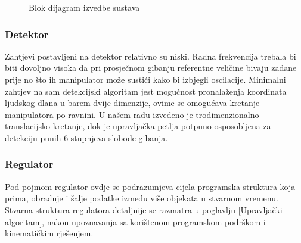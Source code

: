 \documentclass[times, utf8, diplomski, numeric]{fer}
\begin{document}
\begin{figure}[!h]
\centering
{}
\caption{Blok dijagram izvedbe sustava}\label{izvedba}
\end{figure}

\subsubsection{Detektor}
Zahtjevi postavljeni na detektor relativno su niski. 
Radna frekvencija trebala bi biti dovoljno visoka da pri prosječnom gibanju referentne veličine bivaju zadane prije no što ih manipulator može sustići kako bi izbjegli oscilacije.
Minimalni zahtjev na sam detekcijski algoritam jest mogućnost pronalaženja koordinata ljudskog dlana u barem dvije dimenzije, ovime se omogućava kretanje manipulatora po ravnini.
U našem radu izvedeno je trodimenzionalno translacijsko kretanje, dok je upravljačka petlja potpuno osposobljena za detekciju punih 6 stupnjeva slobode gibanja.

\subsubsection{Regulator}
Pod pojmom regulator ovdje se podrazumjeva cijela programska struktura koja prima, obrađuje i šalje podatke između više objekata u stvarnom vremenu.
Stvarna struktura regulatora detaljnije se razmatra u poglavlju \ref{Upravljački algoritam}, nakon upoznavanja sa korištenom programskom podrškom i kinematičkim rješenjem.
\end{document}
